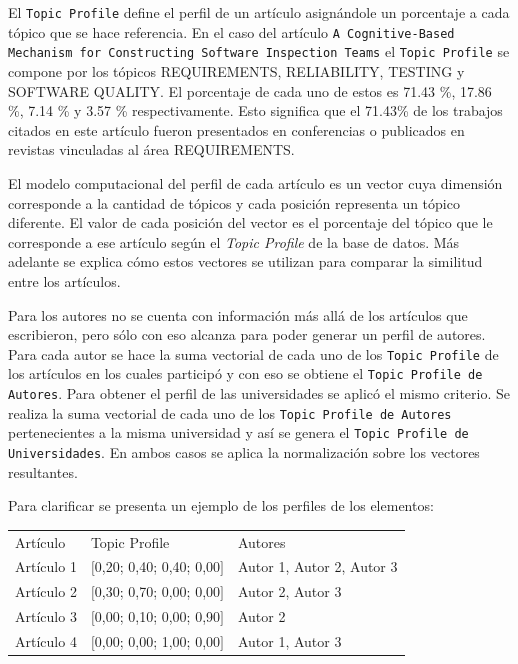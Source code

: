El \texttt{Topic Profile} define el perfil de un artículo asignándole un porcentaje a cada tópico que se hace referencia. En el caso del artículo \texttt{A Cognitive-Based Mechanism for Constructing Software Inspection Teams} el \texttt{Topic Profile} se compone por los tópicos  REQUIREMENTS, RELIABILITY, TESTING y SOFTWARE QUALITY. El porcentaje de cada uno de estos es 71.43 \%, 17.86 \%, 7.14 \% y 3.57 \% respectivamente. Esto significa que el 71.43\% de los trabajos citados en este artículo fueron presentados en conferencias o publicados en revistas vinculadas al área REQUIREMENTS.

El modelo computacional del perfil de cada artículo es un vector cuya dimensión corresponde a la cantidad de tópicos y cada posición representa un tópico diferente. El valor de cada posición del vector es el porcentaje del tópico que le corresponde a ese artículo según el \textit{Topic Profile} de la base de datos. Más adelante se explica cómo estos vectores se utilizan para comparar la similitud entre los artículos.

Para los autores no se cuenta con información más allá de los artículos que escribieron, pero sólo con eso alcanza para poder generar un perfil de autores. Para cada autor se hace la suma vectorial de cada uno de los \texttt{Topic Profile} de los artículos en los cuales participó y con eso se obtiene el \texttt{Topic Profile de Autores}. Para obtener el perfil de las universidades se aplicó el mismo criterio. Se realiza la suma vectorial de cada uno de los \texttt{Topic Profile de Autores} pertenecientes a la misma universidad y así se genera el \texttt{Topic Profile de Universidades}. En ambos casos se aplica la normalización sobre los vectores resultantes.

Para clarificar se presenta un ejemplo de los perfiles de los elementos:

\begin{table}[H]
\begin{tabular}{lll}
	Artículo & Topic Profile & Autores \\
	Artículo 1 & $[$0,20; 0,40; 0,40; 0,00$]$ & Autor 1, Autor 2, Autor 3 \\
	Artículo 2 & $[$0,30; 0,70; 0,00; 0,00$]$ & Autor 2, Autor 3 \\
	Artículo 3 & $[$0,00; 0,10; 0,00; 0,90$]$ & Autor 2 \\
	Artículo 4 & $[$0,00; 0,00; 1,00; 0,00$]$ & Autor 1, Autor 3 \\
\end{tabular}
\label{tabla:topicProfileEj1}
\end{table}

